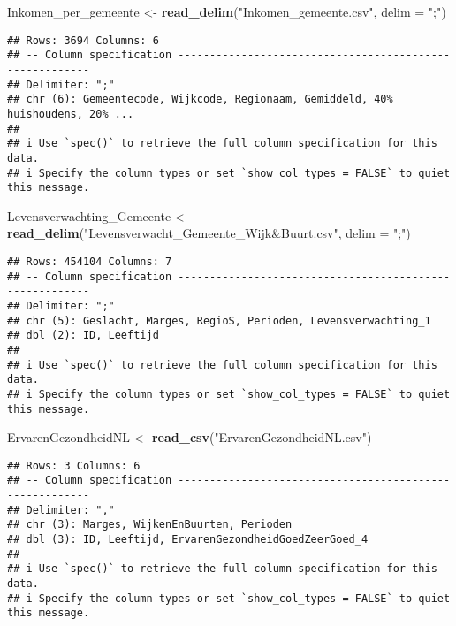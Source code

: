 \documentclass[
]{article}
\newenvironment{Shaded}{\begin{snugshade}}{\end{snugshade}}
\newcommand{\AttributeTok}[1]{\textcolor[rgb]{0.13,0.29,0.53}{#1}}
\newcommand{\FunctionTok}[1]{\textcolor[rgb]{0.13,0.29,0.53}{\textbf{#1}}}
\newcommand{\NormalTok}[1]{#1}
\newcommand{\OtherTok}[1]{\textcolor[rgb]{0.56,0.35,0.01}{#1}}
\newcommand{\StringTok}[1]{\textcolor[rgb]{0.31,0.60,0.02}{#1}}
\begin{document}
\begin{Shaded}
\begin{Highlighting}[]
\NormalTok{Inkomen\_per\_gemeente }\OtherTok{\textless{}{-}} \FunctionTok{read\_delim}\NormalTok{(}\StringTok{"Inkomen\_gemeente.csv"}\NormalTok{, }\AttributeTok{delim =} \StringTok{";"}\NormalTok{)}
\end{Highlighting}
\end{Shaded}

\begin{verbatim}
## Rows: 3694 Columns: 6
## -- Column specification --------------------------------------------------------
## Delimiter: ";"
## chr (6): Gemeentecode, Wijkcode, Regionaam, Gemiddeld, 40% huishoudens, 20% ...
## 
## i Use `spec()` to retrieve the full column specification for this data.
## i Specify the column types or set `show_col_types = FALSE` to quiet this message.
\end{verbatim}

\begin{Shaded}
\begin{Highlighting}[]
\NormalTok{Levensverwachting\_Gemeente }\OtherTok{\textless{}{-}} \FunctionTok{read\_delim}\NormalTok{(}\StringTok{"Levensverwacht\_Gemeente\_Wijk\&Buurt.csv"}\NormalTok{, }\AttributeTok{delim =} \StringTok{";"}\NormalTok{)}
\end{Highlighting}
\end{Shaded}

\begin{verbatim}
## Rows: 454104 Columns: 7
## -- Column specification --------------------------------------------------------
## Delimiter: ";"
## chr (5): Geslacht, Marges, RegioS, Perioden, Levensverwachting_1
## dbl (2): ID, Leeftijd
## 
## i Use `spec()` to retrieve the full column specification for this data.
## i Specify the column types or set `show_col_types = FALSE` to quiet this message.
\end{verbatim}

\begin{Shaded}
\begin{Highlighting}[]
\NormalTok{ErvarenGezondheidNL }\OtherTok{\textless{}{-}} \FunctionTok{read\_csv}\NormalTok{(}\StringTok{"ErvarenGezondheidNL.csv"}\NormalTok{)}
\end{Highlighting}
\end{Shaded}

\begin{verbatim}
## Rows: 3 Columns: 6
## -- Column specification --------------------------------------------------------
## Delimiter: ","
## chr (3): Marges, WijkenEnBuurten, Perioden
## dbl (3): ID, Leeftijd, ErvarenGezondheidGoedZeerGoed_4
## 
## i Use `spec()` to retrieve the full column specification for this data.
## i Specify the column types or set `show_col_types = FALSE` to quiet this message.
\end{verbatim}
\end{document}
